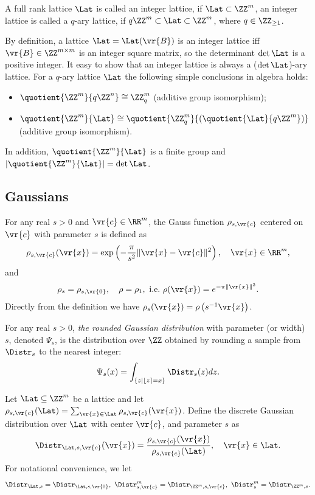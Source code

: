 \documentclass{fundam}
\begin{document}
\vspace{0.5cm}
A full rank lattice $\Lat$ is called an integer lattice, if $\Lat \subset \ZZ^{m}$, an integer lattice is called a $q$-ary lattice, if $q\ZZ^{m}\subset \Lat \subset \ZZ^{m}$, where $q\in\ZZ_{\geq 1}$. 

By definition, a lattice $\Lat=\Lat(\vr{B})$ is an integer lattice iff $\vr{B}\in \ZZ^{m\times m}$ is an integer square matrix, so the determinant $\det \Lat$ is a positive integer. It easy to show that an integer lattice is always a ($\det \Lat$)-ary lattice. For a $q$-ary lattice $\Lat$ the following simple conclusions in algebra holds:
\begin{itemize}
	\item $\quotient{\ZZ^{m}}{q\ZZ^{n}} \cong \ZZ_{q}^{m}$ (additive group isomorphism);
	\item $\quotient{\ZZ^{m}}{\Lat} \cong \quotient{\ZZ_{q}^{m}}{(\quotient{\Lat}{q\ZZ^{m}})}$ (additive group isomorphism).
\end{itemize}
In addition, $\quotient{\ZZ^{m}}{\Lat} $ is a finite group and $|\quotient{\ZZ^{m}}{\Lat} | = \det \Lat$.

\subsection{Gaussians}\label{Gaussian}
For any real $s>0$ and $\vr{c}\in\RR^{m}$, the Gauss function $\rho_{s,\vr{c}}$ centered on $\vr{c}$ with parameter $s$ is defined as
\begin{align*}
	\rho_{s,\vr{c}}(\vr{x})  = \exp \left(-\frac{\pi}{s^{2}}\|\vr{x} - \vr{c} \|^{2}\right), ~~~\vr{x}\in\RR^{m},
\end{align*}
and 
\begin{align*}
	\rho_{s} = \rho_{s, \vr{0}}, ~~~\rho = \rho_{1},~\text{i.e.}~ \rho(\vr{x}) = e^{-\pi\| \vr{x} \|^{2}}.  
\end{align*}
Directly from the definition we have $\rho_{s}(\vr{x}) = \rho\left(  {s}^{-1} \vr{x}\right)$.

For any real $s>0$, \textit{the rounded Gaussian distribution} with parameter (or width) $s$, denoted $\Psi_{s}$, is the distribution over $\ZZ$ obtained by rounding a sample from $\Distr_{s}$ to the nearest integer:
\begin{align*}
	\Psi_{s}(x)= \int_{\{ z\mid \lfloor z \rceil = x\}} \Distr_{s}(z)dz.
\end{align*}

Let $\Lat\subseteq \ZZ^{m}$ be a lattice and let $\rho_{s, \vr{c}} (\Lat) = \sum_{\vr{x}\in \Lat} \rho_{s, \vr{c}}(\vr{x})$. Define the discrete Gaussian distribution over $\Lat$ with center $\vr{c}$, and parameter $s$ as
\begin{align*}
	\Distr_{\Lat, s, \vr{c}} (\vr{x}) =  \frac{\rho_{s, \vr{c}}(\vr{x})}{\rho_{s, \vr{c}}(\Lat)}, ~~~\vr{x}\in\Lat.
\end{align*}
For notational convenience, we let
\begin{align*}
	\Distr_{\Lat, s} = \Distr_{\Lat, s, \vr{0}}, ~ \Distr_{s, \vr{c}}^{m} = \Distr_{\ZZ^{m}, s, \vr{c}}, ~ \Distr_{s}^{m} = \Distr_{\ZZ^{m}, s}.
\end{align*}
\end{document}
